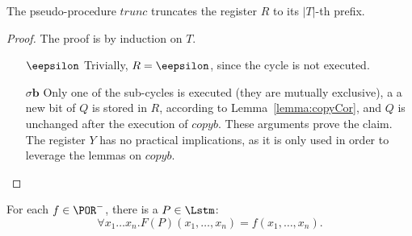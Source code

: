 \begin{lemma}\label{lemma:truncCor}
The pseudo-procedure $trunc$ truncates the
register $R$ to its $|T|$-th prefix.
\end{lemma}

\begin{proof}
The proof is by induction on $T$.
\begin{itemize}
\item[{$\eepsilon$}]
Trivially, $R={\eepsilon}$, since the cycle
is not executed.
%
\item[$\sigma{\mathbf{b}}$]
Only one of the sub-cycles is executed
(they are mutually exclusive),
a {a new bit} of $Q$
is stored in $R$, according to Lemma~\ref{lemma:copyCor},
and $Q$ is unchanged after the
execution of $copyb$.
These arguments prove the claim.
The register $Y$ has no practical implications,
as it is only used in order to leverage
the lemmas on $copyb$.
\end{itemize}
\end{proof}










\begin{lemma}\label{lemma:implPOR-SIMP}
For each $f\in \POR^-$, there is a $P\in {\Lstm}$:
$$
\forall x_1\dots x_n.F(P)(x_1,\dots, x_n) = f(x_1,\dots, x_n).
$$
\end{lemma}

